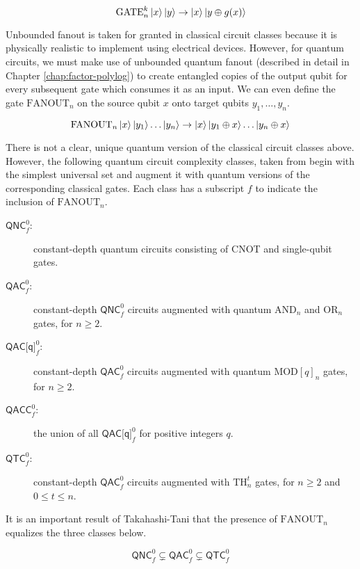 \begin{equation}
\text{GATE}^k_n\left\vert{x}\right\rangle\left\vert{y}\right\rangle \rightarrow \left\vert{x}\right\rangle\left\vert{y \oplus g(x)}\right\rangle
\end{equation}

Unbounded fanout is taken for granted in classical circuit classes
because it is physically realistic to implement using electrical
devices. However, for quantum circuits, we must make use of
unbounded quantum fanout (described in detail in Chapter \ref{chap:factor-polylog})
to create entangled copies of the output qubit for every subsequent
gate which consumes it as an input. We can even define the
gate $\text{FANOUT}_n$ on the source qubit $x$ onto target qubits
$y_1, \ldots, y_n$.

\begin{equation}
\text{FANOUT}_n\left\vert{x}\right\rangle\left\vert{y_1}\right\rangle\ldots\left\vert{y_n}\right\rangle \rightarrow \left\vert{x}\right\rangle\left\vert{y_1 \oplus x}\right\rangle\ldots\left\vert{y_n \oplus x}\right\rangle
\end{equation}

There is not a clear, unique quantum version of the classical
circuit classes above. However, the following quantum circuit
complexity classes, taken from \cite{Hoyer2002}
begin with the simplest universal set and augment it with
quantum versions of the corresponding classical gates. Each
class has a subscript $f$ to indicate the inclusion of
$\text{FANOUT}_n$.

\begin{description}
\item[$\textsf{QNC}^0_f$:]
constant-depth quantum circuits consisting of CNOT and single-qubit gates.
\item[$\textsf{QAC}^0_f$:]
constant-depth $\textsf{QNC}^0_f$ circuits augmented with quantum $\text{AND}_n$ and $\text{OR}_n$ gates,
for $n \ge 2$.
\item[$\textsf{QAC[q]}^0_f$:]
constant-depth $\textsf{QAC}^0_f$ circuits augmented with quantum $\text{MOD}[q]_n$ gates,
for $n \ge 2$.
\item[$\textsf{QACC}^0_f$:] the union of all $\textsf{QAC[q]}^0_f$ for positive integers $q$.
\item[$\textsf{QTC}^0_f$:]
constant-depth $\textsf{QAC}^0_f$ circuits augmented with $\text{TH}_n^t$ gates, for $n \ge 2$ and
$0 \le t \le n$.
\end{description}

It is an important result of Takahashi-Tani \cite{Takahashi2011} that the presence of
$\text{FANOUT}_n$ equalizes the three classes below.

\begin{equation}
\textsf{QNC}^0_f \subsetneq \textsf{QAC}^0_f \subsetneq \textsf{QTC}^0_f
\end{equation}

